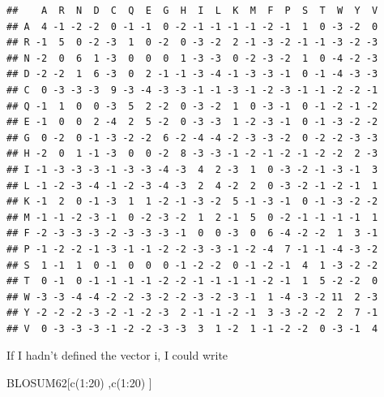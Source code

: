 \documentclass[
]{book}
\newenvironment{Shaded}{\begin{snugshade}}{\end{snugshade}}
\newcommand{\DecValTok}[1]{\textcolor[rgb]{0.00,0.00,0.81}{#1}}
\newcommand{\FunctionTok}[1]{\textcolor[rgb]{0.00,0.00,0.00}{#1}}
\newcommand{\NormalTok}[1]{#1}
\newcommand{\SpecialCharTok}[1]{\textcolor[rgb]{0.00,0.00,0.00}{#1}}
\begin{document}
\begin{verbatim}
##    A  R  N  D  C  Q  E  G  H  I  L  K  M  F  P  S  T  W  Y  V
## A  4 -1 -2 -2  0 -1 -1  0 -2 -1 -1 -1 -1 -2 -1  1  0 -3 -2  0
## R -1  5  0 -2 -3  1  0 -2  0 -3 -2  2 -1 -3 -2 -1 -1 -3 -2 -3
## N -2  0  6  1 -3  0  0  0  1 -3 -3  0 -2 -3 -2  1  0 -4 -2 -3
## D -2 -2  1  6 -3  0  2 -1 -1 -3 -4 -1 -3 -3 -1  0 -1 -4 -3 -3
## C  0 -3 -3 -3  9 -3 -4 -3 -3 -1 -1 -3 -1 -2 -3 -1 -1 -2 -2 -1
## Q -1  1  0  0 -3  5  2 -2  0 -3 -2  1  0 -3 -1  0 -1 -2 -1 -2
## E -1  0  0  2 -4  2  5 -2  0 -3 -3  1 -2 -3 -1  0 -1 -3 -2 -2
## G  0 -2  0 -1 -3 -2 -2  6 -2 -4 -4 -2 -3 -3 -2  0 -2 -2 -3 -3
## H -2  0  1 -1 -3  0  0 -2  8 -3 -3 -1 -2 -1 -2 -1 -2 -2  2 -3
## I -1 -3 -3 -3 -1 -3 -3 -4 -3  4  2 -3  1  0 -3 -2 -1 -3 -1  3
## L -1 -2 -3 -4 -1 -2 -3 -4 -3  2  4 -2  2  0 -3 -2 -1 -2 -1  1
## K -1  2  0 -1 -3  1  1 -2 -1 -3 -2  5 -1 -3 -1  0 -1 -3 -2 -2
## M -1 -1 -2 -3 -1  0 -2 -3 -2  1  2 -1  5  0 -2 -1 -1 -1 -1  1
## F -2 -3 -3 -3 -2 -3 -3 -3 -1  0  0 -3  0  6 -4 -2 -2  1  3 -1
## P -1 -2 -2 -1 -3 -1 -1 -2 -2 -3 -3 -1 -2 -4  7 -1 -1 -4 -3 -2
## S  1 -1  1  0 -1  0  0  0 -1 -2 -2  0 -1 -2 -1  4  1 -3 -2 -2
## T  0 -1  0 -1 -1 -1 -1 -2 -2 -1 -1 -1 -1 -2 -1  1  5 -2 -2  0
## W -3 -3 -4 -4 -2 -2 -3 -2 -2 -3 -2 -3 -1  1 -4 -3 -2 11  2 -3
## Y -2 -2 -2 -3 -2 -1 -2 -3  2 -1 -1 -2 -1  3 -3 -2 -2  2  7 -1
## V  0 -3 -3 -3 -1 -2 -2 -3 -3  3  1 -2  1 -1 -2 -2  0 -3 -1  4
\end{verbatim}

If I hadn't defined the vector i, I could write

\begin{Shaded}
\begin{Highlighting}[]
\NormalTok{BLOSUM62[}\FunctionTok{c}\NormalTok{(}\DecValTok{1}\SpecialCharTok{:}\DecValTok{20}\NormalTok{) ,}\FunctionTok{c}\NormalTok{(}\DecValTok{1}\SpecialCharTok{:}\DecValTok{20}\NormalTok{)  ]}
\end{Highlighting}
\end{Shaded}
\end{document}
